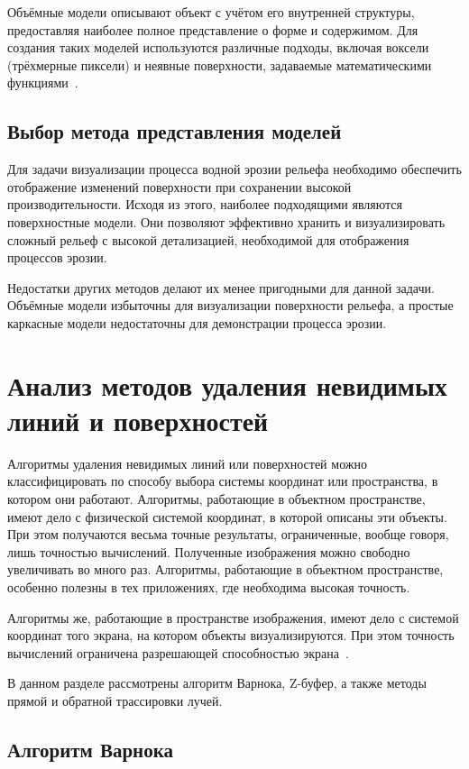 Объёмные модели описывают объект с учётом его внутренней структуры, предоставляя наиболее полное представление о
форме и содержимом. Для создания таких моделей используются различные подходы, включая воксели (трёхмерные пиксели)
и неявные поверхности, задаваемые математическими функциями~\cite{rodz}.

\subsection{Выбор метода представления моделей}

Для задачи визуализации процесса водной эрозии рельефа необходимо обеспечить отображение изменений поверхности
при сохранении высокой производительности.
Исходя из этого, наиболее подходящими являются поверхностные модели.
Они позволяют эффективно хранить и визуализировать сложный рельеф с высокой детализацией,
необходимой для отображения процессов эрозии.

Недостатки других методов делают их менее пригодными для данной задачи.
Объёмные модели избыточны для визуализации поверхности рельефа,
а простые каркасные модели недостаточны для демонстрации процесса эрозии.

\clearpage

\section{Анализ методов удаления невидимых линий и поверхностей}

Алгоритмы удаления невидимых линий или поверхностей можно классифицировать по способу выбора системы
координат или пространства, в котором они работают. Алгоритмы, работающие в объектном пространстве, имеют дело с
физической системой координат, в которой описаны эти объекты. При этом получаются весьма точные результаты,
ограниченные, вообще говоря, лишь точностью вычислений. Полученные изображения можно свободно увеличивать во много раз.
Алгоритмы, работающие в объектном пространстве, особенно полезны в тех приложениях, где необходима высокая точность.

Алгоритмы же, работающие в пространстве изображения, имеют дело с системой координат того экрана, на котором объекты
визуализируются. При этом точность вычислений ограничена разрешающей способностью экрана~\cite{rodz}.

В данном разделе рассмотрены алгоритм Варнока, Z-буфер, а также методы
прямой и обратной трассировки лучей.

\subsection{Алгоритм Варнока}


